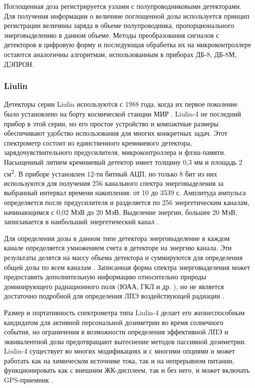 Поглощенная доза регистрируется узлами с полупроводниковыми детекторами. Для получения информации о величине поглощенной дозы используется принцип регистрации величины заряда в объеме полупроводника, пропорционального энерговыделению в данном объеме. Методы преобразования сигналов с детекторов в цифровую форму и последующая обработка их на микроконтроллере остаются аналогичны алгоритмам, использованным в приборах ДБ-8, ДБ-8М, ДЭПРОН.  


\subsubsection{Liulin}

Детекторы серии Liulin используются с 1988 года, когда их первое поколение было установлено на борту космической станции МИР \cite{Caffrey2011}. Liulin-4 не последний прибор в этой серии, но его простое устройство и компактные размеры обеспечивают удобство использования для многих конкретных задач. Этот спектрометр состоит из единственного кремниевого детектора, зарядочувствительного предусилителя, микроконтроллера и флэш-памяти. Насыщенный литием кремниевый детектор имеет толщину 0,3 мм и площадь 2 см\textsuperscript{2}. В приборе установлен 12-ти битный АЦП, но только 8 бит из них используются для получения 256 канального спектра энерговыделения за выбранный интервал времени накопления: от 10 до 3539 с. Амплитуда импульса определяется после предусилителя и разделяется по 256 энергетическим каналам, начинающимся с 0,02 МэВ до 20 МэВ. Выделение энергии, большее 20 МэВ, записывается в наибольший энергетический канал \cite{Dachev2002} .


Для определения дозы в данном типе детектора энерговыделение в каждом канале определяется умножением счета в детекторе на энергию канала. Эти результаты делятся на массу объема детектора и суммируются для определения общей дозы по всем каналам \cite{Dachev2002} \cite{Luszik-Bhadra2010}. Записанная форма спектра энерговыделения может предоставить дополнительную информацию относительно природы доминирующего радиационного поля (ЮАА, ГКЛ и др. ), но не является достаточно подробной для определения ЛПЭ воздействующей радиации \cite{Caffrey2011}. 



Размер и портативность спектрометра типа Liulin-4 делает его жизнеспособным кандидатом для активной персональной дозиметрии во время солнечного события, но ограничения в возможности определения эффективной ЛПЭ и эквивалентной дозы предотвращают вытеснение методов пассивной дозиметрии. Liulin-4 существует во многих модификациях и с многими опциями и может работать как на химическом источнике тока, так и на непрерывном питании, функционировать как с внешним ЖК-дисплеем, так и без него, и может включать GPS-приемник \cite{Dachev2002}.	

